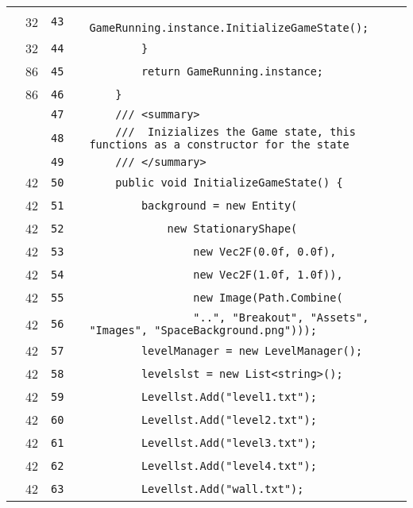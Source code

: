 \documentclass[a4paper,landscape,10pt]{article}
\begin{document}
\begin{longtable}[l]{lrrll}
\cellcolor{green} & 32 & \verb~43~ & & \verb~            GameRunning.instance.InitializeGameState();~\\
\cellcolor{green} & 32 & \verb~44~ & & \verb~        }~\\
\cellcolor{green} & 86 & \verb~45~ & & \verb~        return GameRunning.instance;~\\
\cellcolor{green} & 86 & \verb~46~ & & \verb~    }~\\
\cellcolor{gray} &  & \verb~47~ & & \verb~    /// <summary>~\\
\cellcolor{gray} &  & \verb~48~ & & \verb~    ///  Inizializes the Game state, this functions as a constructor for the state~\\
\cellcolor{gray} &  & \verb~49~ & & \verb~    /// </summary>~\\
\cellcolor{green} & 42 & \verb~50~ & & \verb~    public void InitializeGameState() {~\\
\cellcolor{green} & 42 & \verb~51~ & & \verb~        background = new Entity(~\\
\cellcolor{green} & 42 & \verb~52~ & & \verb~            new StationaryShape(~\\
\cellcolor{green} & 42 & \verb~53~ & & \verb~                new Vec2F(0.0f, 0.0f),~\\
\cellcolor{green} & 42 & \verb~54~ & & \verb~                new Vec2F(1.0f, 1.0f)),~\\
\cellcolor{green} & 42 & \verb~55~ & & \verb~                new Image(Path.Combine(~\\
\cellcolor{green} & 42 & \verb~56~ & & \verb~                "..", "Breakout", "Assets", "Images", "SpaceBackground.png")));~\\
\cellcolor{green} & 42 & \verb~57~ & & \verb~        levelManager = new LevelManager();~\\
\cellcolor{green} & 42 & \verb~58~ & & \verb~        levelslst = new List<string>();~\\
\cellcolor{green} & 42 & \verb~59~ & & \verb~        Levellst.Add("level1.txt");~\\
\cellcolor{green} & 42 & \verb~60~ & & \verb~        Levellst.Add("level2.txt");~\\
\cellcolor{green} & 42 & \verb~61~ & & \verb~        Levellst.Add("level3.txt");~\\
\cellcolor{green} & 42 & \verb~62~ & & \verb~        Levellst.Add("level4.txt");~\\
\cellcolor{green} & 42 & \verb~63~ & & \verb~        Levellst.Add("wall.txt");~\\

\end{longtable}
\end{document}

